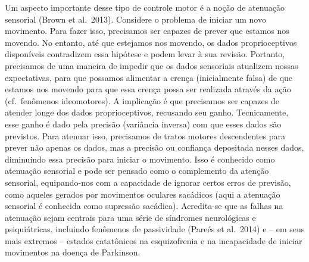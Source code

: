 \documentclass[
  12pt,
]{book}
\begin{document}
Um aspecto importante desse tipo de controle motor é a noção de atenuação sensorial (Brown et al.~2013). Considere o problema de iniciar um novo movimento. Para fazer isso, precisamos ser capazes de prever que estamos nos movendo. No entanto, até que estejamos nos movendo, os dados proprioceptivos disponíveis contradizem essa hipótese e podem levar à sua revisão. Portanto, precisamos de uma maneira de impedir que os dados sensoriais atualizem nossas expectativas, para que possamos alimentar a crença (inicialmente falsa) de que estamos nos movendo para que essa crença possa ser realizada através da ação (cf.~fenômenos ideomotores). A implicação é que precisamos ser capazes de atender longe dos dados proprioceptivos, recusando seu ganho. Tecnicamente, esse ganho é dado pela precisão (variância inversa) com que esses dados são previstos. Para atenuar isso, precisamos de tratos motores descendentes para prever não apenas os dados, mas a precisão ou confiança depositada nesses dados, diminuindo essa precisão para iniciar o movimento. Isso é conhecido como atenuação sensorial e pode ser pensado como o complemento da atenção sensorial, equipando-nos com a capacidade de ignorar certos erros de previsão, como aqueles gerados por movimentos oculares sacádicos (aqui a atenuação sensorial é conhecida como supressão sacádica). Acredita-se que as falhas na atenuação sejam centrais para uma série de síndromes neurológicas e psiquiátricas, incluindo fenômenos de passividade (Pareés et al.~2014) e -- em seus mais extremos -- estados catatônicos na esquizofrenia e na incapacidade de iniciar movimentos na doença de Parkinson.
\end{document}
